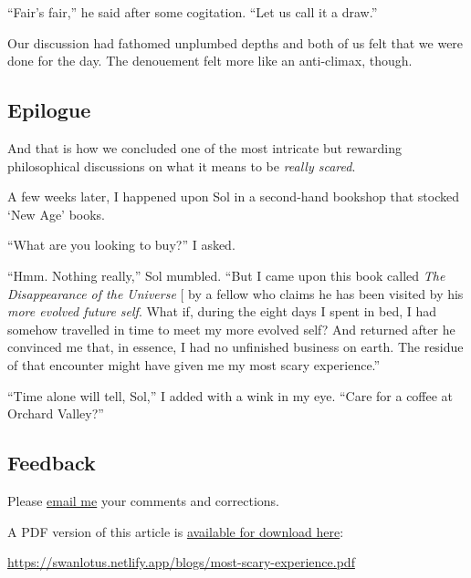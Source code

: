 \documentclass[
  a4paper,
]{article}
\begin{document}
``Fair's fair,'' he said after some cogitation. ``Let us call it a
draw.''

Our discussion had fathomed unplumbed depths and both of us felt that we
were done for the day. The denouement felt more like an anti-climax,
though.

\subsection{Epilogue}\label{epilogue}

And that is how we concluded one of the most intricate but rewarding
philosophical discussions on what it means to be \emph{really scared}.

A few weeks later, I happened upon Sol in a second-hand bookshop that
stocked `New Age' books.

``What are you looking to buy?'' I asked.

``Hmm. Nothing really,'' Sol mumbled. ``But I came upon this book called
\emph{The Disappearance of the Universe}
{[}\citeproc{ref-renard2004}{3}{]} by a fellow who claims he has been
visited by his \emph{more evolved future self}. What if, during the
eight days I spent in bed, I had somehow travelled in time to meet my
more evolved self? And returned after he convinced me that, in essence,
I had no unfinished business on earth. The residue of that encounter
might have given me my most scary experience.''

``Time alone will tell, Sol,'' I added with a wink in my eye. ``Care for
a coffee at Orchard Valley?''

\subsection{Feedback}\label{feedback}

Please \href{mailto:feedback.swanlotus@gmail.com}{email me} your
comments and corrections.

\noindent A PDF version of this article is
\href{./most-scary-experience.pdf}{available for download here}:

\begin{small}

\begin{sffamily}

\url{https://swanlotus.netlify.app/blogs/most-scary-experience.pdf}

\end{sffamily}

\end{small}
\end{document}
